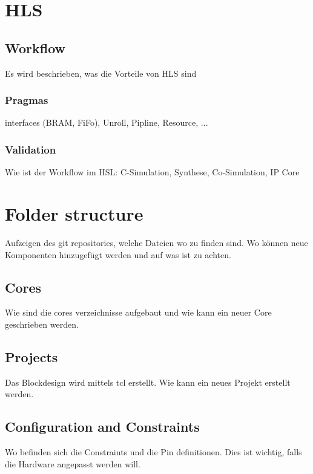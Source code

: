 \section{HLS}
\subsection{Workflow}
Es wird beschrieben, was die Vorteile von HLS sind

\subsubsection{Pragmas}
interfaces (BRAM, FiFo), Unroll, Pipline, Resource, ...

\subsubsection{Validation}
Wie ist der Workflow im HSL: C-Simulation, Synthese, Co-Simulation, IP Core

\section{Folder structure}
Aufzeigen des git repositories, welche Dateien wo zu finden sind. Wo können neue
Komponenten hinzugefügt werden und auf was ist zu achten.

\subsection{Cores}
Wie sind die cores verzeichnisse aufgebaut und wie kann ein neuer Core geschrieben 
werden.

\subsection{Projects}
Das Blockdesign wird mittels tcl erstellt. Wie kann ein neues Projekt erstellt werden.

\subsection{Configuration and Constraints}
Wo befinden sich die Constraints und die Pin definitionen. Dies ist wichtig,
falls die Hardware angepasst werden will.

